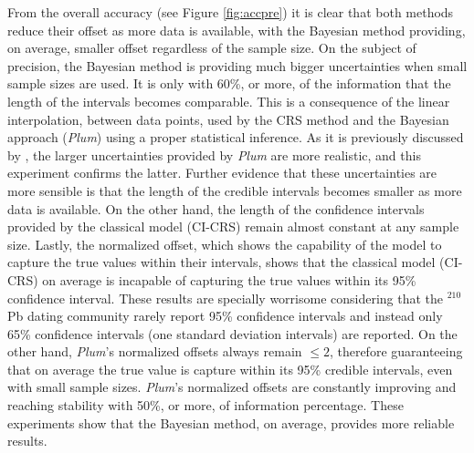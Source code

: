 \documentclass [10pt] {article}
\begin{document}
From the overall accuracy (see Figure \ref{fig:accpre}) it is clear that both methods reduce their offset as more data is available, with the Bayesian method providing, on average, smaller offset regardless of the sample size. 
On the subject of precision, the Bayesian method is providing much bigger uncertainties when small sample sizes are used. 
It is only with 60\%, or more, of the information that the length of the intervals becomes comparable. 
This is a consequence of the linear interpolation, between data points, used by the CRS method and the Bayesian approach (\textit{Plum}) using a proper statistical inference.  
As it is previously discussed by \citet{Aquino2020}, the larger uncertainties provided by \textit{Plum} are more realistic, and this experiment confirms the latter.
Further evidence that these uncertainties are more sensible is that the length of the credible intervals becomes smaller as more data is available. 
On the other hand, the length of the confidence intervals provided by the classical model (CI-CRS) remain almost constant at any sample size.
Lastly, the normalized offset, which shows the capability of the model to capture the true values within their intervals, shows that the classical model (CI-CRS) on average is incapable of capturing the true values within its 95\% confidence interval. 
These results are specially worrisome considering that the $^{210}$Pb dating community rarely report 95\% confidence intervals and instead only 65\% confidence intervals (one standard deviation intervals) are reported.
On the other hand, \textit{Plum}'s normalized offsets always remain $\leq 2$, therefore guaranteeing that on average the true value is capture within its 95\% credible intervals, even with small sample sizes.
\textit{Plum}'s normalized offsets are constantly improving and reaching stability with 50\%, or more, of information percentage.
These experiments show that the Bayesian method, on average, provides more reliable results.
\end{document}
